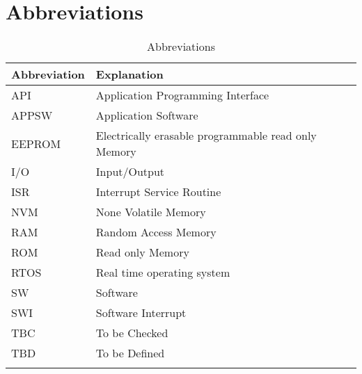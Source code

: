\chapter{Abbreviations}
\label{secAbbreviations}

\begin{longtable}[c]{|l|l|}
\hline
Abbreviation & Explanation
\\ \hline
API	    & Application Programming Interface                    \\ \hline
APPSW	  & Application Software                                 \\ \hline
EEPROM	& Electrically erasable programmable read only Memory  \\ \hline
I/O	    & Input/Output                                         \\ \hline
ISR	    & Interrupt Service Routine                            \\ \hline
NVM     & None Volatile Memory                                 \\ \hline
RAM	    & Random Access Memory                                 \\ \hline
ROM	    & Read only Memory                                     \\ \hline
RTOS    & Real time operating system                           \\ \hline
SW	    & Software                                             \\ \hline
SWI	    & Software Interrupt                                   \\ \hline
TBC	    & To be Checked                                        \\ \hline
TBD	    & To be Defined                                        \\ \hline
\caption{Abbreviations} \label{tabAbbrev}
\end{longtable}
